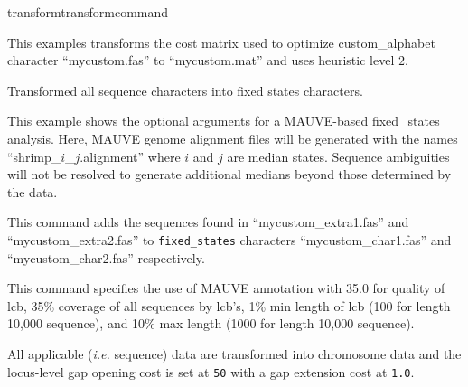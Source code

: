 \begin{command}{transform}{transformcommand}
\begin{poyexamples}
		{This examples transforms the cost matrix used to optimize custom\_alphabet 
		character ``mycustom.fas'' to ``mycustom.mat'' and uses heuristic level $2$.}
         
        		 {Transformed all sequence characters into fixed states characters.}
		 
		{This example shows the optional arguments for a MAUVE-based fixed\_states analysis.
		Here, MAUVE genome alignment files will be generated with the names ``shrimp\_$i$\_$j$.alignment'' 
		where $i$ and $j$ are median states.  Sequence ambiguities will not be resolved to generate 
		additional medians beyond those determined by the
		data.}
		
		{This command adds the sequences found in ``mycustom\_extra1.fas'' and ``mycustom\_extra2.fas'' 
		to \texttt{fixed\_states} characters 
		``mycustom\_char1.fas'' and ``mycustom\_char2.fas'' respectively.}
	         	
		{This command specifies the use of MAUVE annotation with 35.0 for quality of lcb,
		35\% coverage of all sequences by lcb's, 1\% min length of lcb (100 for length 10,000 
		sequence), and 10\% max length (1000 for length 10,000 sequence).}
		
          
          
          {All applicable (\emph{i.e.} sequence) data are transformed into chromosome data 
		and the locus-level gap opening cost is set at \texttt{50} with a gap extension cost at \texttt{1.0}.}
              		          
	\end{poyexamples}	    

\end{command}


